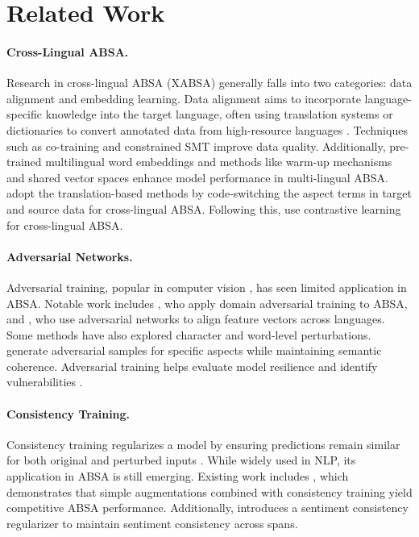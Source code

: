 \section{Related Work}
\paragraph{Cross-Lingual ABSA.}

Research in cross-lingual ABSA (XABSA) generally falls into two categories: data alignment and embedding learning. Data alignment aims to incorporate language-specific knowledge into the target language, often using translation systems or dictionaries to convert annotated data from high-resource languages \cite{zhou-etal-2013-collective}. Techniques such as co-training \cite{zhou2015cl} and constrained SMT \cite{lambert-2015-aspect} improve data quality. Additionally, pre-trained multilingual word embeddings and methods like warm-up mechanisms \cite{Li2020UnsupervisedCA} and shared vector spaces \cite{jebbara-cimiano-2019-zero} enhance model performance in multi-lingual ABSA. \citet{zhang2021cross} adopt the translation-based methods by code-switching the aspect terms in target and source data for cross-lingual ABSA. Following this, \citet{lin2023} use contrastive learning for cross-lingual ABSA.



\paragraph{Adversarial Networks.}

Adversarial training, popular in computer vision \cite{knoester2022}, has seen limited application in ABSA. Notable work includes \citet{Miyato2017VirtualAT}, who apply domain adversarial training to ABSA, and \citet{Wang_Pan_2018}, who use adversarial networks to align feature vectors across languages. Some methods have also explored character and word-level perturbations. \citet{Mamta2022AdversarialSG} generate adversarial samples for specific aspects while maintaining semantic coherence. Adversarial training helps evaluate model resilience and identify vulnerabilities \cite{lin2023}.

\paragraph{Consistency Training.}
Consistency training regularizes a model by ensuring predictions remain similar for both original and perturbed inputs \cite{zhou-etal-2022-conner}. While widely used in NLP, its application in ABSA is still emerging. Existing work includes \citet{chen-etal-2022-unsupervised-data}, which demonstrates that simple augmentations combined with consistency training yield competitive ABSA performance. Additionally, \citet{zhang-etal-2023-span} introduces a sentiment consistency regularizer to maintain sentiment consistency across spans.